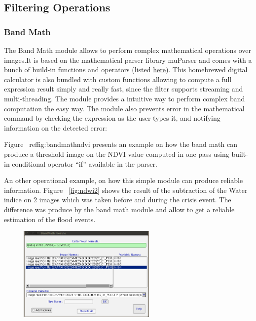 \subsection{Filtering Operations}
\subsubsection{Band Math}
The Band Math module allows to perform complex mathematical operations
over images.It is based on the mathematical parser library muParser
and comes with a bunch of build-in functions and operators (listed
\href{http://muparser.sourceforge.net/mup_features.html#idDef2}{here}). This
homebrewed digital calculator is also bundled with custom functions
allowing to compute a full expression result simply and really fast,
since the filter supports streaming and multi-threading.  The \mont
module provides a intuitive way to perform complex band computation
the easy way. The module also prevents error in the mathematical
command by checking the expression as the user types it, and notifying
information on the detected error:

Figure ~ref{fig:bandmathndvi} presents an example on how the band math
can produce a threshold image on the NDVI value computed in one pass
using built-in conditional operator ``if'' available in the parser.

An other operational
example, on how this simple module can produce reliable information.
Figure ~\ref{fig:ndwi2} shows the result of the subtraction of the Water
indice on 2 images which was taken before and during the crisis event.
The difference was produce by the band math module and allow to get a
reliable estimation of the flood events.

\begin{figure}
  \center
  \includegraphics[width=0.6\textwidth]{../Art/MonteverdiImages/monteverdi_band_math_ndvi_threshold.png}
  \label{fig:bandmathndvi}
\end{figure}


